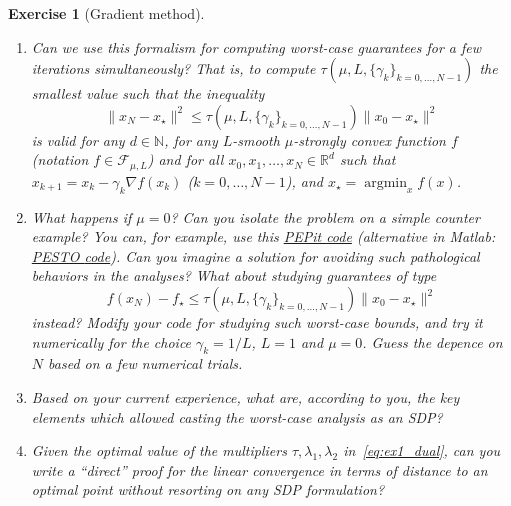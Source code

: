 \documentclass[11pt,a4paper]{article}
\DeclareMathOperator*{\argmin}{argmin}
\newcommand{\pesto}{{PESTO }}
\newcommand{\pepit}{{PEPit }}
\newtheorem{exercise}{Exercise}
\begin{document}
\begin{exercise}[Gradient method]
\begin{enumerate}
{\begin{equation}
\begin{aligned}
	&0=\tau-\lambda_1+\lambda_2-\lambda_5+\lambda_6\\
	&1=-\lambda_3+\lambda_4+\lambda_5-\lambda_6,
	\end{aligned}
	\end{equation}}where ``$*$'' denotes symmetrical elements in the PSD matrix. Is there a simple closed-form solution for this problem? Note that this SDP is already coded \href{https://github.com/PerformanceEstimation/Learning-Performance-Estimation/tree/main/Exercises - codes/Jupyter/Exercise1.ipynb}{here} (alternative in Matlab: \href{https://github.com/PerformanceEstimation/Learning-Performance-Estimation/blob/main/Exercises - codes/Matlab/Exercise1_SDP_functionvalues.m}{here})
	
	Hint \#1: plot some values for the multipliers; hint \#2: pick $\lambda_1=\lambda_3=\lambda_6=0$; does the problem simplify?
	\item Can we use this formalism for computing worst-case guarantees for a few iterations simultaneously? That is, to compute $\tau(\mu,L,\{\gamma_k\}_{k=0,\hdots,N-1})$ the smallest value such that the inequality
	\[ \|x_{N}-x_\star\|^2 \leqslant \tau(\mu,L,\{\gamma_k\}_{k=0,\ldots,N-1}) \|x_0-x_\star\|^2\]
	is valid for any $d\in\mathbb{N}$, for any $L$-smooth $\mu$-strongly convex function $f$ (notation $f\in\mathcal{F}_{\mu,L}$) and for all $x_0,x_1,\ldots,x_N\in\mathbb{R}^d$ such that $x_{k+1}=x_k-\gamma_k \nabla f(x_k)$ ($k=0,\ldots,N-1$), and $x_\star=\argmin_x f(x)$.
	\item What happens if $\mu=0$? Can you isolate the problem on a simple counter example? You can, for example, use this \href{https://github.com/PerformanceEstimation/Learning-Performance-Estimation/tree/main/Exercises - codes/Jupyter/Exercise1.ipynb}{\pepit code} (alternative in Matlab: \href{https://github.com/PerformanceEstimation/Learning-Performance-Estimation/blob/main/Exercises - codes/Matlab/Exercise1_dimReduction.m}{\pesto code}). Can you imagine a solution for avoiding such pathological behaviors in the analyses? What about studying guarantees of type\[ f(x_N)-f_\star \leqslant \tau(\mu,L,\{\gamma_k\}_{k=0,\ldots,N-1}) \|x_0-x_\star\|^2\]
	instead? Modify your code for studying such worst-case bounds, and try it numerically for the choice $\gamma_k=1/L$, $L=1$ and $\mu=0$. Guess the depence on $N$ based on a few numerical trials.
	\item Based on your current experience, what are, according to you, the key elements which allowed casting the worst-case analysis as an SDP?
	\item Given the optimal value of the multipliers $\tau,\lambda_1,\lambda_2$ in~\eqref{eq:ex1_dual}, can you write a ``direct'' proof for the linear convergence in terms of distance to an optimal point without resorting on any SDP formulation?
	\end{enumerate}
	\end{exercise}
\end{document}
